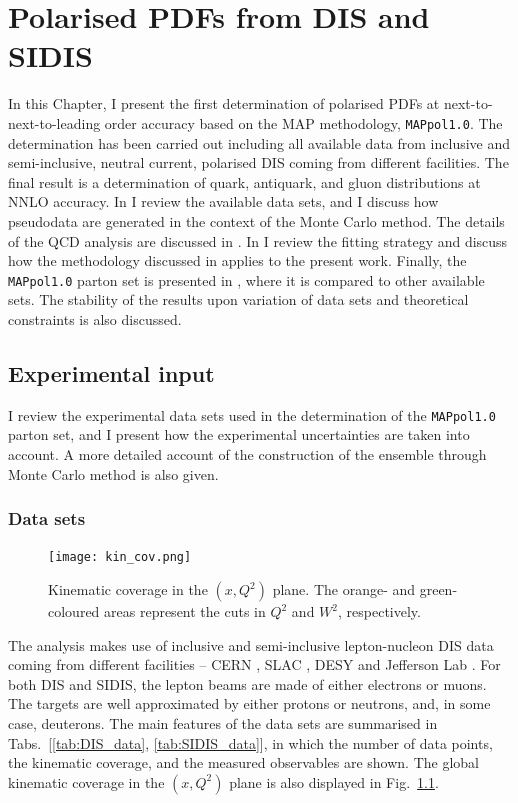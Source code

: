 \chapter{Polarised PDFs from DIS and SIDIS}
\label{ch:4}

In this Chapter, I present the first determination of polarised PDFs at next-to-next-to-leading order accuracy based on the MAP methodology, \texttt{MAPpol1.0}. The determination has been carried out including all available data from inclusive and semi-inclusive, neutral current, polarised DIS coming from different facilities. The final result is a determination of quark, antiquark, and gluon distributions at NNLO accuracy. In  I review the available data sets, and I discuss how pseudodata are generated in the context of the Monte Carlo method. The details of the QCD analysis are discussed in . In  I review the fitting strategy and discuss how the methodology discussed in  applies to the present work. Finally, the \texttt{MAPpol1.0} parton set is presented in , where it is compared to other available sets. The stability of the results upon variation of data sets and theoretical constraints is also discussed.

\section{Experimental input}
\label{sec:4.1}

I review the experimental data sets used in the determination of the \texttt{MAPpol1.0} parton set, and I present how the experimental uncertainties are taken into account. A more detailed account of the construction of the ensemble through Monte Carlo method is also given.

\subsection{Data sets}
\begin{figure}[t]
  \centering
  \texttt{[image: kin\_cov.png]} 
  \caption{\small{Kinematic coverage in the $(x,Q^2)$ plane. The orange- and green-coloured areas represent the cuts in $Q^2$ and $W^2$, respectively.}}
  \label{fig:kin_cov}
\end{figure}
The analysis makes use of inclusive and semi-inclusive lepton-nucleon DIS data coming from different facilities -- CERN \cite{EuropeanMuon:1989yki, SpinMuon:1999udj, COMPASS:2006mhr, COMPASS:2010wkz, COMPASS:2010hwr}, SLAC \cite{E142:1996thl, E143:1998hbs, E154:1997xfa, E155:2000qdr}, DESY \cite{HERMES:2018awh, HERMES:2006jyl, HERMES:1997hjr} and Jefferson Lab \cite{Kramer:2002tt, JeffersonLabHallA:2004tea, CLAS:2014qtg}. For both DIS and SIDIS, the lepton beams are made of either electrons or muons. The targets are well approximated  by either protons or neutrons, and, in some case, deuterons. The main features of the data sets are summarised in Tabs.~[\ref{tab:DIS_data}, \ref{tab:SIDIS_data}], in which the number of data points, the kinematic coverage, and the measured observables are shown. The global kinematic coverage in the $(x,Q^2)$ plane is also displayed in Fig.~\ref{fig:kin_cov}.%


